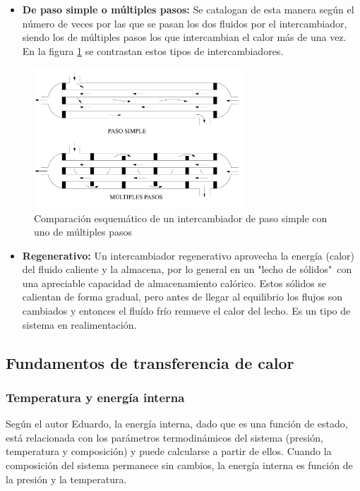 \documentclass[12pt,letterpaper]{article}     %
\begin{document}
\begin{itemize}
\item \textbf{De paso simple o múltiples pasos:} Se catalogan de esta manera según el número de veces por las que se pasan los dos fluidos por el intercambiador, siendo los de múltiples pasos los que intercambian el calor más de una vez. En la figura \ref{fig:pasos} se contrastan estos tipos de intercambiadores.
\end{itemize}

\begin{figure}[H]
\centering
\includegraphics[width=0.7\textwidth]{pasos.png}
\caption{Comparación esquemático de un intercambiador de paso simple con uno de múltiples pasos \cite{Jaramillo}}
\label{fig:pasos}
\end{figure}

\begin{itemize}
\item \textbf{Regenerativo:} Un intercambiador regenerativo aprovecha la energía (calor) del fluido caliente y la almacena, por lo general en un "lecho de sólidos"\ con una apreciable capacidad de almacenamiento calórico. Estos sólidos se calientan de forma gradual, pero antes de llegar al equilibrio los flujos son cambiados y entonces el fluído frío remueve el calor del lecho. Es un tipo de sistema en realimentación. 
\end{itemize}


\subsection{Fundamentos de transferencia de calor}

\subsubsection{Temperatura y energía interna}
 
Según el autor Eduardo, la energía interna, dado que es una función de estado, está relacionada con los parámetros termodinámicos del sistema (presión, temperatura y composición) y puede calcularse a partir de ellos. Cuando la composición del sistema permanece sin cambios, la energía interna es función de la presión y la temperatura.
\end{document}
